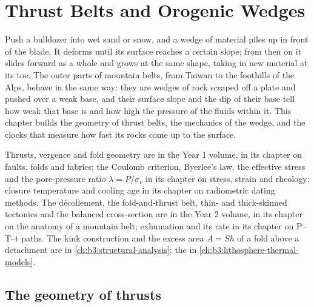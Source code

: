 \chapter{Thrust Belts and Orogenic Wedges}\label{ch:b3:orogenic-wedges}

Push a bulldozer into wet sand or snow, and a wedge of material piles up in
front of the blade. It deforms until its surface reaches a certain slope;
from then on it slides forward as a whole and grows at the same shape,
taking in new material at its toe. The outer parts of mountain belts, from
Taiwan to the foothills of the Alps, behave in the same way: they are wedges
of rock scraped off a plate and pushed over a weak base, and their surface
slope and the dip of their base tell how weak that base is and how high the
pressure of the fluids within it. This chapter builds the geometry of thrust
belts, the mechanics of the wedge, and the clocks that measure how fast its
rocks come up to the surface.

\begin{recall}
Thrusts, vergence and fold geometry are in the Year 1 volume, in its chapter
on faults, folds and fabrics; the Coulomb criterion, Byerlee's law, the
effective stress and the pore-pressure ratio $\lambda = P/\sigma_v$ in its
chapter on stress, strain and rheology; closure temperature and cooling age
in its chapter on radiometric dating methods. The décollement, the
fold-and-thrust belt, thin- and thick-skinned tectonics and the balanced
cross-section are in the Year 2 volume, in its chapter on the anatomy of a
mountain belt; exhumation and its rate in its chapter on P--T--t paths. The
kink construction and the excess area $A = Sh$ of a fold above a detachment
are in \cref{ch:b3:structural-analysis}; the  in
\cref{ch:b3:lithosphere-thermal-models}.
\end{recall}

\section{The geometry of thrusts}\label{sec:b3:orogenic-wedges:geometry}

